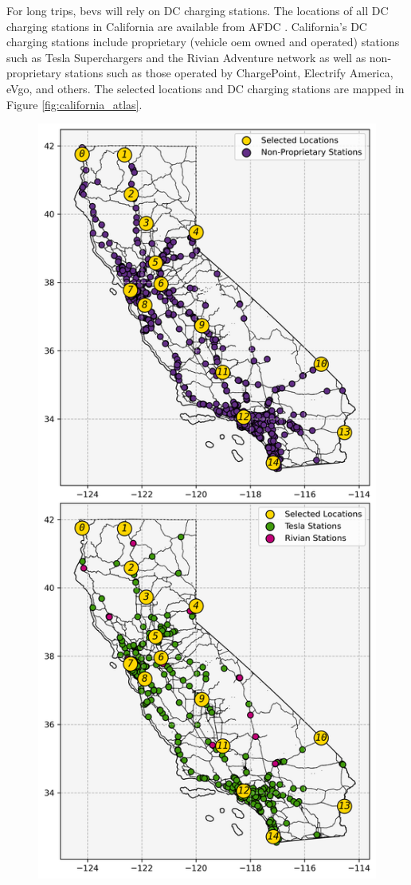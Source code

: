 \documentclass[11pt]{article}
\begin{document}
\begin{multicols}{2}
For long trips, \glspl{bev} will rely on DC charging stations. The locations of all DC charging stations in California are available from AFDC \cite{afdc_2023}. California's DC charging stations include proprietary (vehicle \gls{oem} owned and operated) stations such as Tesla Superchargers and the Rivian Adventure network as well as non-proprietary stations such as those operated by ChargePoint, Electrify America, eVgo, and others. The selected locations and DC charging stations are mapped in Figure \ref{fig:california_atlas}.

\begin{figure}[H]
	\centering
	\includegraphics[width = \linewidth]{figs/California_SNG_Vertical.png}

\end{figure}
\end{multicols}
\end{document}
